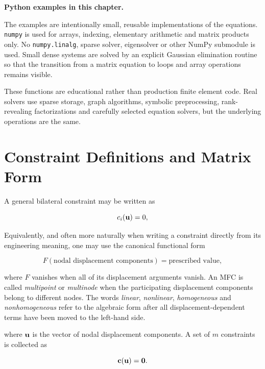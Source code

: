 \begin{bbox}
\textbf{Python examples in this chapter.}

The examples are intentionally small, reusable implementations of the equations.
\texttt{numpy} is used for arrays, indexing, elementary arithmetic and matrix
products only. No \texttt{numpy.linalg}, sparse solver, eigensolver or other
NumPy submodule is used. Small dense systems are solved by an explicit Gaussian
elimination routine so that the transition from a matrix equation to loops and
array operations remains visible.

These functions are educational rather than production finite element code.
Real solvers use sparse storage, graph algorithms, symbolic preprocessing,
rank-revealing factorizations and carefully selected equation solvers, but the
underlying operations are the same.
\end{bbox}

\section{Constraint Definitions and Matrix Form}

A general bilateral constraint may be written as

\begin{equation}\label{canonical-constraint-form}
    c_i(\mathbf{u}) = 0,
\end{equation}

Equivalently, and often more naturally when writing a constraint directly from
its engineering meaning, one may use the canonical functional form

\begin{equation}
    F(\text{nodal displacement components})=\text{prescribed value},
\end{equation}

where $F$ vanishes when all of its displacement arguments vanish. An MFC is
called \textit{multipoint} or \textit{multinode} when the participating
displacement components belong to different nodes. The words \textit{linear},
\textit{nonlinear}, \textit{homogeneous} and \textit{nonhomogeneous} refer
to the algebraic form after all displacement-dependent terms have been moved to
the left-hand side.

where $\mathbf{u}$ is the vector of nodal displacement components. A set of $m$
constraints is collected as

\begin{equation}\label{mfc-general-nonlinear}
    \mathbf{c}(\mathbf{u})=\mathbf{0}.
\end{equation}

